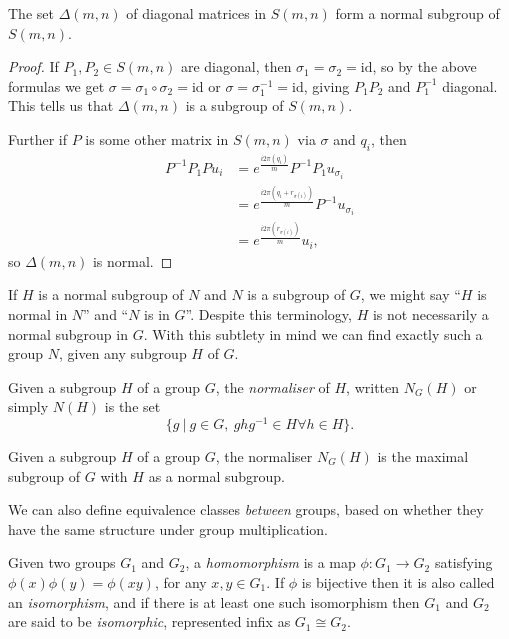 \begin{prop}
	The set $\Delta(m, n)$ of diagonal matrices in $S(m, n)$ form a normal subgroup of $S(m, n)$.
\end{prop}
\begin{proof}
	If $P_1, P_2 \in S(m, n)$ are diagonal, then $\sigma_1 = \sigma_2 = \text{id}$, so by the above formulas we get $\sigma = \sigma_1\circ \sigma_2 = \text{id}$ or $\sigma = \sigma_1^{-1} = \text{id}$, giving $P_1P_2$ and $P_1^{-1}$ diagonal. This tells us that $\Delta(m, n)$ is a subgroup of $S(m, n)$.
	
	Further if $P$ is some other matrix in $S(m, n)$ via $\sigma$ and $q_i$, then
	\begin{align*}
		P^{-1}P_1Pu_i
		&= e^{\frac{i2\pi(q_i)}{m}}P^{-1}P_1u_{\sigma_i}
		\\&= e^{\frac{i2\pi(q_i+r_{\sigma(i)})}{m}}P^{-1}u_{\sigma_i}
		\\&= e^{\frac{i2\pi(r_{\sigma(i)})}{m}}u_i,
	\end{align*}
so $\Delta(m, n)$ is normal.
\end{proof}

If $H$ is a normal subgroup of $N$ and $N$ is a subgroup of $G$, we might say ``$H$ is normal in $N$'' and ``$N$ is in $G$''. Despite this terminology, $H$ is not necessarily a normal subgroup in $G$. With this subtlety in mind we can find exactly such a group $N$, given any subgroup $H$ of $G$.
\begin{define}
Given a subgroup $H$ of a group $G$, the \emph{normaliser} of $H$, written $N_G(H)$ or simply $N(H)$ is the set
\[\{g\ |\ g \in G,\ ghg^{-1} \in H \forall h \in H\}.\]
\end{define}
\begin{prop}
	Given a subgroup $H$ of a group $G$, the normaliser $N_G(H)$ is the maximal subgroup of $G$ with $H$ as a normal subgroup.
\end{prop}

We can also define equivalence classes \emph{between} groups, based on whether they have the same structure under group multiplication.
\begin{define}
	Given two groups $G_1$ and $G_2$, a \emph{homomorphism} is a map $\phi: G_1 \to G_2$ satisfying $\phi(x)\phi(y) = \phi(xy)$, for any $x, y \in G_1$. If $\phi$ is bijective then it is also called an \emph{isomorphism}, and if there is at least one such isomorphism then $G_1$ and $G_2$ are said to be \emph{isomorphic}, represented infix as $G_1 \cong G_2$.
\end{define}

